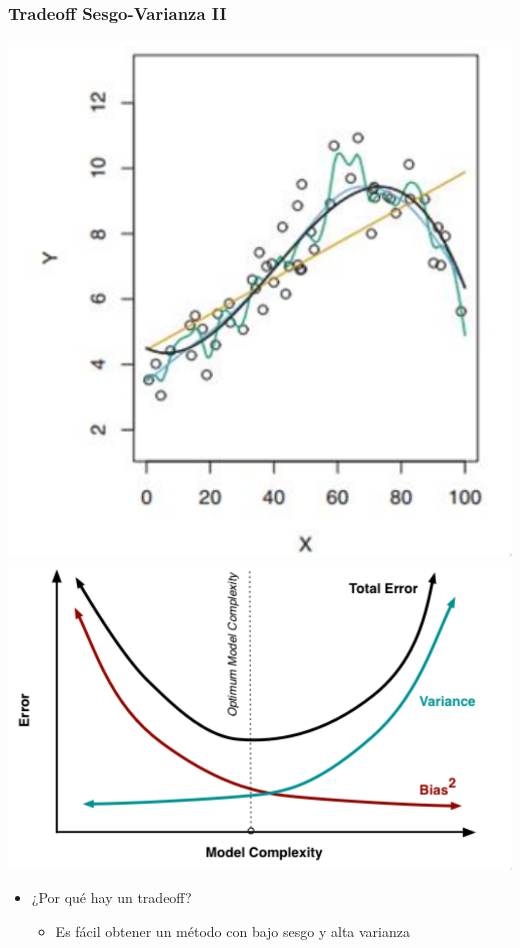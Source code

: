 \documentclass[leqno, 10pt, envcountsect]{beamer}
\numberwithin{equation}{section}
\theoremstyle{definition}
\theoremstyle{example}
\numberwithin{figure}{section}
\numberwithin{table}{section}
\let\olditem\item
\renewcommand{\item}{%
\olditem\vspace{1pt}}
\begin{document}
\begin{frame}[fragile=singleslide]
  \frametitle{Tradeoff Sesgo-Varianza II}
  \begin{center}
    \includegraphics[scale=0.25]{bvt2.png}
    \includegraphics[scale=0.225]{complexity.png}
  \end{center}
  \begin{itemize}
    \item ¿Por qué hay un tradeoff?
      \begin{itemize}
        \item Es fácil obtener un método con bajo sesgo y alta varianza

\end{itemize}
\end{itemize}
\end{frame}
\end{document}
